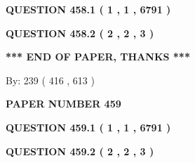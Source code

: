 \documentclass[12pt]{article}
\begin{document}
 
 
 
   
   
  
\vspace{0.2in}
  
{\textbf{\Large{QUESTION
458.1 
 ( 1 , 1 , 6791 )
}}}
  
  
  
\vspace{0.2in}
  
{\textbf{\Large{QUESTION
458.2 
 ( 2 , 2 , 3 )
}}}
  
  
   
   
 \vspace{0.2in}
 
   
   
   
   
\vspace{1.0in} 
{\textbf{\large{ *** END OF PAPER, THANKS *** }}} 
   
   
\hspace{1.0in} By: 
 239 ( 416 ,  613 )
   
   
   
   
\newpage 
\setcounter{page}{ 
   459001 } 
   
   
   
   
 {\textbf{ \Large{ PAPER NUMBER  459  }}}
   
   
\vspace{0.2in}
   
   
   
   
   
   
 \vspace{0.2in}
 
 
 
 
   
   
  
\vspace{0.2in}
  
{\textbf{\Large{QUESTION
459.1 
 ( 1 , 1 , 6791 )
}}}
  
  
  
\vspace{0.2in}
  
{\textbf{\Large{QUESTION
459.2 
 ( 2 , 2 , 3 )
}}}
  
  
   
   
 \vspace{0.2in}
 
   
   
   
   
\end{document}
